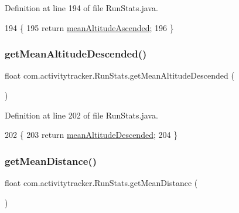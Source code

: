 Definition at line 194 of file Run\+Stats.\+java.


\begin{DoxyCode}
194                                            \{
195         \textcolor{keywordflow}{return} \mbox{\hyperlink{classcom_1_1activitytracker_1_1_run_stats_aecbe62c15075fe9be1604333c355fab6}{meanAltitudeAscended}};
196     \}
\end{DoxyCode}
\mbox{\label{classcom_1_1activitytracker_1_1_run_stats_a6f7829790dae6f302fe4cd218fc6b21f}} 
\subsubsection{\texorpdfstring{get\+Mean\+Altitude\+Descended()}{getMeanAltitudeDescended()}}
{\footnotesize\ttfamily float com.\+activitytracker.\+Run\+Stats.\+get\+Mean\+Altitude\+Descended (\begin{DoxyParamCaption}{ }\end{DoxyParamCaption})}



Definition at line 202 of file Run\+Stats.\+java.


\begin{DoxyCode}
202                                             \{
203         \textcolor{keywordflow}{return} \mbox{\hyperlink{classcom_1_1activitytracker_1_1_run_stats_a578eae64367a00c625f4685fe879fe7c}{meanAltitudeDescended}};
204     \}
\end{DoxyCode}
\mbox{\label{classcom_1_1activitytracker_1_1_run_stats_a28d7e9769b52fd45351a07c9d2e435f2}} 
\subsubsection{\texorpdfstring{get\+Mean\+Distance()}{getMeanDistance()}}
{\footnotesize\ttfamily float com.\+activitytracker.\+Run\+Stats.\+get\+Mean\+Distance (\begin{DoxyParamCaption}{ }\end{DoxyParamCaption})}



